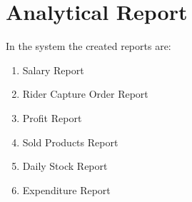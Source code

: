 \documentclass[12pt,a4paper]{article}
\begin{document}
\section{Analytical Report}
In the system the created reports are:
\begin{enumerate}
\item Salary Report  
\item Rider Capture Order Report 
\item Profit Report 
\item Sold Products Report
\item Daily Stock Report 
\item Expenditure Report
\end{enumerate}
\end{document}
